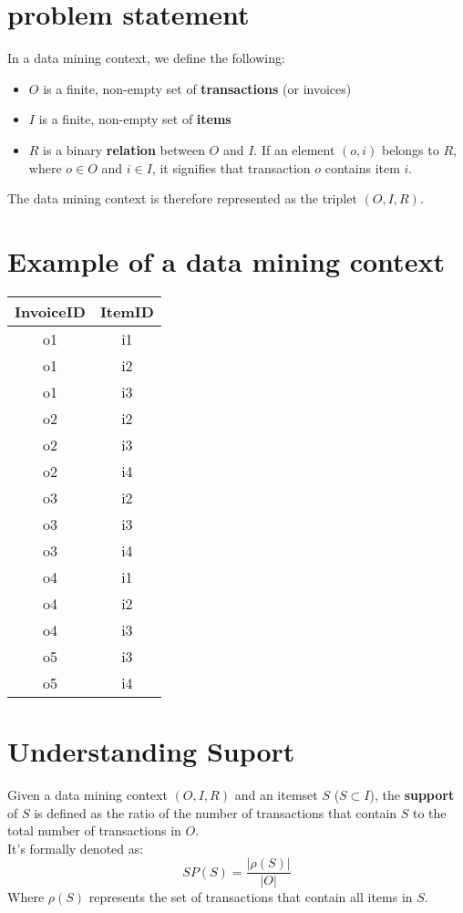 \section{problem statement}
 In a data mining context, we define the following:
 \begin{itemize}
     \item \(O\) is a finite, non-empty set of \textbf{transactions} (or invoices)
     \item \(I\) is a finite, non-empty set of \textbf{items}
     \item \(R\) is a binary \textbf{relation} between \(O\) and \(I\). If an element \((o,i)\) belongs to \(R\), where \(o \in O\) and \(i \in I\), it signifies that transaction \(o\) contains item \(i\).
\end{itemize}
The data mining context is therefore represented as the triplet \((O,I,R)\).
\section{Example of a data mining context}
\begin{center}
\begin{tabular}{c|c}
\hline InvoiceID & ItemID \\
\hline o1 & i1 \\
\hline o1 & i2 \\
\hline o1 & i3 \\
\hline o2 & i2 \\
\hline o2 & i3 \\
\hline o2 & i4 \\
\hline o3 & i2 \\
\hline o3 & i3 \\
\hline o3 & i4 \\
\hline o4 & i1 \\
\hline o4 & i2 \\
\hline o4 & i3 \\
\hline o5 & i3 \\
\hline o5 & i4 \\
\hline
\end{tabular}
\end{center}
\section{Understanding Suport}
Given a data mining context \((O,I,R)\) and an itemset \(S\) (\(S \subset I\)), the \textbf{support} of \(S\) is defined as the ratio of the number of transactions that contain \(S\) to the total number of transactions in \(O\).\\
It's formally denoted as:
\[SP(S)=\dfrac{|\rho(S)|}{|O|}\]
Where \(\rho(S)\) represents the set of transactions that contain all items in \(S\).
